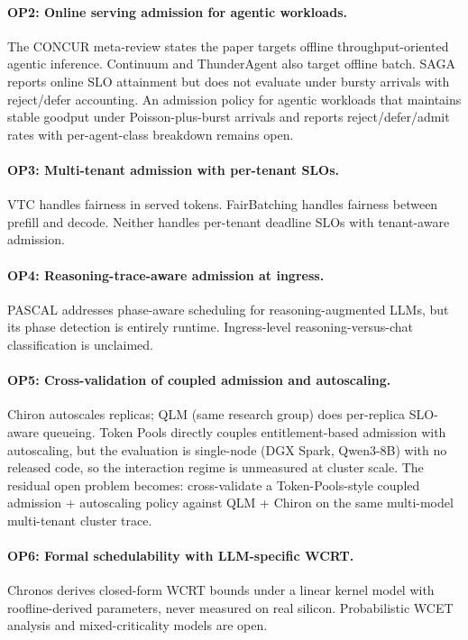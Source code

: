 \paragraph{OP2: Online serving admission for agentic workloads.}
The CONCUR meta-review states the paper targets offline
throughput-oriented agentic inference. Continuum and ThunderAgent
also target offline batch. SAGA reports online SLO attainment but
does not evaluate under bursty arrivals with reject/defer accounting.
An admission policy for agentic workloads that maintains stable
goodput under Poisson-plus-burst arrivals and reports
reject/defer/admit rates with per-agent-class breakdown remains
open.

\paragraph{OP3: Multi-tenant admission with per-tenant SLOs.}
VTC handles fairness in served tokens. FairBatching handles fairness
between prefill and decode. Neither handles per-tenant deadline SLOs
with tenant-aware admission.

\paragraph{OP4: Reasoning-trace-aware admission at ingress.}
PASCAL addresses phase-aware scheduling for reasoning-augmented LLMs,
but its phase detection is entirely runtime. Ingress-level
reasoning-versus-chat classification is unclaimed.

\paragraph{OP5: Cross-validation of coupled admission and autoscaling.}
Chiron autoscales replicas; QLM (same research group) does
per-replica SLO-aware queueing. Token Pools
\citep{cunningham2026tokenpools} directly couples entitlement-based
admission with autoscaling, but the evaluation is single-node
(DGX Spark, Qwen3-8B) with no released code, so the interaction
regime is unmeasured at cluster scale. The residual open problem
becomes: cross-validate a Token-Pools-style coupled admission +
autoscaling policy against QLM + Chiron on the same multi-model
multi-tenant cluster trace.

\paragraph{OP6: Formal schedulability with LLM-specific WCRT.}
Chronos derives closed-form WCRT bounds under a linear kernel model
with roofline-derived parameters, never measured on real silicon.
Probabilistic WCET analysis and mixed-criticality models are open.

